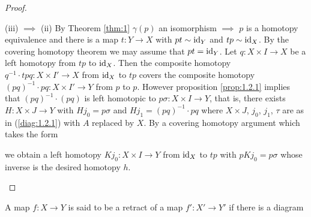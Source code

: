 \documentclass[../main]{subfiles}
\begin{document}
\begin{proof}
\begin{implyenumerate}
\item[(iii) $\implies$ (ii)]By Theorem \ref{thm:1} $\gamma(p)$ an isomorphism $\implies$ $p$ is a homotopy equivalence and there is a map $t : Y \longrightarrow X$ with $pt \sim \operatorname{id}_Y$ and $tp \sim \operatorname{id}_X$. By the covering homotopy theorem we may assume that $pt = \operatorname{id}_Y$. Let $q : X \times I \longrightarrow X$ be a left homotopy from $tp$ to $\operatorname{id}_X$. Then the composite homotopy $q^{-1} \cdot tpq : X \times I' \longrightarrow X$ from $\operatorname{id}_X$ to $tp$ covers the composite homotopy $(pq)^{-1} \cdot pq : X \times I' \longrightarrow Y$ from $p$ to $p$. However proposition \ref{prop:1.2.1} implies that $(pq)^{-1} \cdot (pq)$ is left homotopic to $p\sigma : X \times I \longrightarrow Y$, that is, there exists $H : X \times J \longrightarrow Y$ with $H j_0 = p\sigma$ and $H j_1 = (pq)^{-1} \cdot pq$ where $X \times J$, $j_0$, $j_1$, $\tau$ are as in (\ref{diag:1.2.1}) with $A$ replaced by $X$. By a covering homotopy argument which takes the form

\begin{center}
\end{center} 

we obtain a left homotopy $K j_0 : X \times I \longrightarrow Y$ from $\operatorname{id}_X$ to $tp$ with $p Kj_0 = p\sigma$ whose inverse is the desired homotopy $h$. 
\end{implyenumerate}

\end{proof}

\begin{definition*}
A map $f \colon X \longrightarrow Y$ is said to be a retract of a map $f' : X' \longrightarrow Y'$ if there is a diagram

\begin{center}
\end{center}
\end{definition*} 
\end{document}
